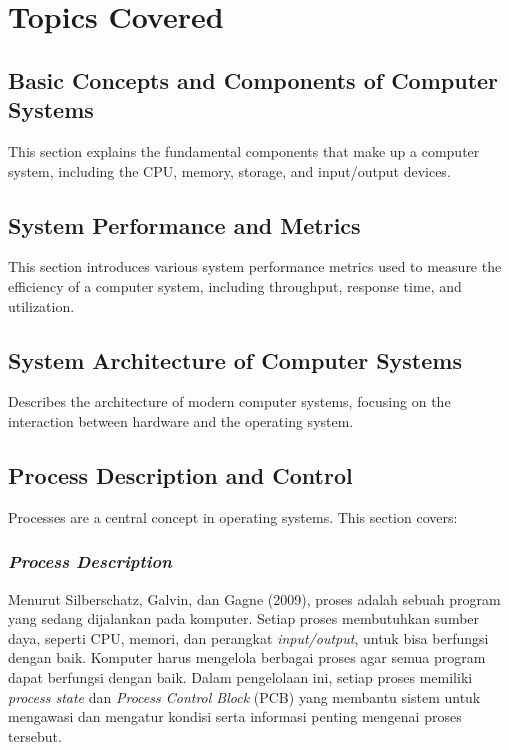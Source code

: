 \documentclass[12pt]{article}
\begin{document}
\section{Topics Covered}

\subsection{Basic Concepts and Components of Computer Systems}
This section explains the fundamental components that make up a computer system, including the CPU, memory, storage, and input/output devices.

\subsection{System Performance and Metrics}
This section introduces various system performance metrics used to measure the efficiency of a computer system, including throughput, response time, and utilization.

\subsection{System Architecture of Computer Systems}
Describes the architecture of modern computer systems, focusing on the interaction between hardware and the operating system.

\subsection{Process Description and Control}
Processes are a central concept in operating systems. This section covers:
    \subsubsection{\textit{Process Description}}
    Menurut Silberschatz, Galvin, dan Gagne (2009), proses adalah sebuah
    program yang sedang dijalankan pada komputer. Setiap proses membutuhkan
    sumber daya, seperti CPU, memori, dan perangkat \textit{input/output},
    untuk bisa berfungsi dengan baik. Komputer harus mengelola berbagai
    proses agar semua program dapat berfungsi dengan baik. Dalam pengelolaan ini,
    setiap proses memiliki \textit{process state} dan \textit{Process Control Block}
    (PCB) yang membantu sistem untuk mengawasi dan mengatur kondisi serta informasi 
    penting mengenai proses tersebut.
    
\end{document}
